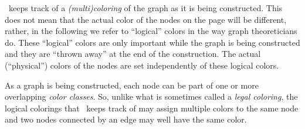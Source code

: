 \label{section-library-graph-coloring}

\tikzname\ keeps track of a \emph{(multi)coloring} of the graph as it
is being constructed. This does not mean that the 
actual color of the nodes on the page will be different, rather, in
the following we refer to ``logical'' colors in the way graph
theoreticians do. These ``logical'' colors are only important while
the graph is being constructed and they are ``thrown away'' at the end
of the construction. The actual (``physical'') colors of the nodes are
set independently of these logical colors.

As a graph is being constructed, each node can be part of one or more
overlapping \emph{color classes}. So, unlike what is sometimes called a
\emph{legal coloring}, the logical colorings that \tikzname\ keeps
track of may assign multiple colors to the same node and two nodes
connected by an edge may well have the same color.

